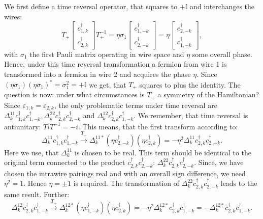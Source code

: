 We first define a time reversal operator, that squares to $ + \mathbb{I}$ and interchanges the wires: 
\begin{equation}
T_+\begin{bmatrix} c^\dagger_{1,k} \\ c^\dagger_{2,k} \end{bmatrix} T_+^{-1} = \eta\sigma_1 \begin{bmatrix} c^\dagger_{1,-k} \\ c^\dagger_{2,-k} \end{bmatrix} = \eta\begin{bmatrix} c^\dagger_{2,-k} \\ c^\dagger_{1,-k} \end{bmatrix},\nonumber
\end{equation} 
with $\sigma_1$ the first Pauli matrix operating in wire space and $\eta$ some overall phase. Hence, under this time reversal transformation a fermion from wire 1 is transformed into a fermion in wire 2 and acquires the phase $\eta$. Since $(\eta\sigma_1)(\eta\sigma_1)^* = \sigma_1^2 = + \mathbb{I}$ we get, that $T_+$ squares to plus the identity. The question is now: under what circumstances is $T_+$ a symmetry of the Hamiltonian? Since $\varepsilon_{1,k} = \varepsilon_{2,k}$, the only problematic terms under time reversal are $\Delta^{11}_k c^\dagger_{1,k}c^\dagger_{1,-k}, \Delta^{22}_k c^\dagger_{2,k}c^\dagger_{2,-k}$ and $\Delta^{12}_kc^\dagger_{2,k}c^\dagger_{1,-k}$. We remember, that time reversal is antiunitary: $TiT^{-1} = -i$. This means, that the first transform according to:
\begin{equation}
\Delta^{11}_k c^\dagger_{1,k}c^\dagger_{1,-k} \overset{T_+}{\to} \Delta^{11*}_k \left(\eta c^\dagger_{2,-k}\right)\left(\eta c^\dagger_{2,k}\right) = -\eta^2\Delta^{11}_k c^\dagger_{2,k}c^\dagger_{2,-k}. \nonumber
\end{equation}
Here we use, that $\Delta^{11}_k$ is chosen to be real. This term should be identical to the original term connected to the product $c^\dagger_{2,k}c^\dagger_{2,-k}$: $\Delta^{22}_k c^\dagger_{2,k}c^\dagger_{2,-k}$. Since, we have chosen the intrawire pairings real and with an overall sign difference, we need $\eta^2 = 1$. Hence $\eta = \pm 1$ is required. The transformation of $\Delta^{22}_k c^\dagger_{2,k}c^\dagger_{2,-k}$ leads to the same result. Further:
\begin{equation}
\Delta^{12}_k c^\dagger_{2,k}c^\dagger_{1,-k} \overset{T_+}{\to} \Delta^{12*}_k \left(\eta c^\dagger_{1,-k}\right)\left( \eta c^\dagger_{2,k}\right) = -\eta^2 \Delta^{12*}_k c^\dagger_{2,k}c^\dagger_{1,-k} = - \Delta^{12*}_k c^\dagger_{2,k}c^\dagger_{1,-k}. \nonumber
\end{equation}
